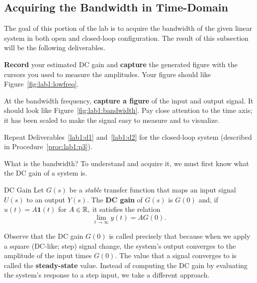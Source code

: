 \subsection{Acquiring the Bandwidth in Time-Domain}
The goal of this portion of the lab is to acquire the bandwidth of the
given linear system in both open and closed-loop configuration.
The result of this subsection will be the following deliverables.
%
\begin{deliverable}[label={lab1:d1}]
  \textbf{Record} your estimated DC gain and \textbf{capture} the generated
  figure with the cursors you used to measure the amplitudes.
  Your figure should like Figure~\ref{fig:lab1:lowfreq}.
\end{deliverable}
%
\begin{deliverable}[label={lab1:d2}]
  At the bandwidth frequency,
  \textbf{capture a figure} of the input and output signal. It should look
  like Figure~\ref{fig:lab1:bandwidth}. Pay close attention to the time
  axis; it has been scaled to make the signal easy to measure and to visualize.
\end{deliverable}
%
\begin{deliverable}[label={lab1:d3}]
  Repeat Deliverables~\ref{lab1:d1} and~\ref{lab1:d2} for the closed-loop
  system (described in Procedure~\ref{proc:lab1:p3}).
\end{deliverable}
%
What is the bandwidth? To understand and acquire it,
we must first know what the DC gain of a system is.
%
\begin{definition}[label={def:lab1:dcgain}]{DC Gain}
  Let \(G(s)\) be a \emph{stable} transfer function
  that maps an input signal \(U(s)\) to an
  output \(Y(s).\) The \textbf{DC gain} of \(G(s)\) is \(G(0)\) and,
  if \(u(t) = A \mathbf{1}(t)\) for \(A \in \mathbb{R},\) it satisfies the relation
  \[
    \lim_{t\to \infty} y(t) = A G(0).
  \]
\end{definition}
%
Observe that the DC gain \(G(0)\) is called precisely that because when we
apply a square (DC-like; step) signal change, the system's output converges
to the amplitude of the input times \(G(0).\)
The value that a signal converges to is called the \textbf{steady-state} value.
%
Instead of computing the DC gain by evaluating the system's response to a step
input, we take a different approach.
%
